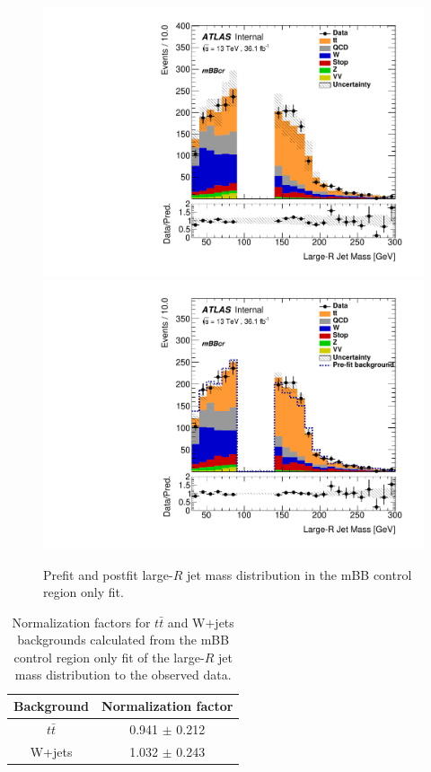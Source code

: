 \begin{figure}[!h]
\begin{center}
\includegraphics[scale=0.33]{./figures/boosted/CROnlyFit/mBB_Prefit}
\includegraphics[scale=0.33]{./figures/boosted/CROnlyFit/mBB_Postfit}\\
\caption{Prefit and postfit large-$R$ jet mass distribution in the mBB control region only fit.}
\label{fig:boosted_fitstudies_mBBcr_mBB}
\end{center}
\end{figure}

\begin{table}
\begin{center}
\begin{tabular}{c|c}
Background & Normalization factor  \\      
\hline
$t\bar{t}$ &  0.941 $\pm$ 0.212 \\
W+jets     &  1.032 $\pm$ 0.243 \\
\end{tabular}
\end{center}
\caption{Normalization factors for $t\bar{t}$ and W+jets backgrounds calculated from the mBB control
region only fit of the large-$R$ jet mass distribution to the observed data.} 
\label{tab:boosted_fitstudies_mBBcr_normfact}
\end{table}


